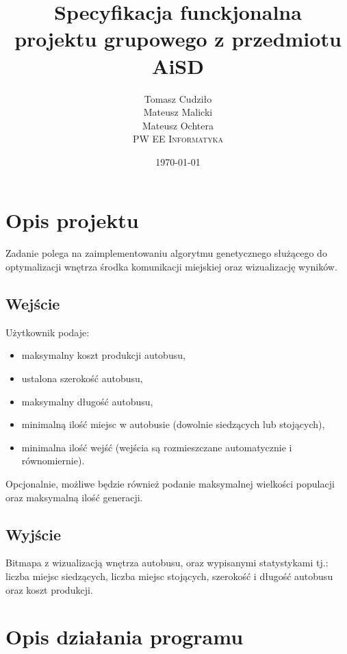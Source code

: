 \documentclass[10pt,a4paper]{article}
\begin{document}
\title{
  Specyfikacja funckjonalna\\
  projektu grupowego z przedmiotu AiSD
}
\author{
  Tomasz Cudziło\\
  Mateusz Malicki\\
  Mateusz Ochtera\\[14pt]
  \textsc{PW EE Informatyka}\\[7pt]
}
\date{\today}
\maketitle



\section{Opis projektu}

Zadanie polega na zaimplementowaniu algorytmu genetycznego służącego do
optymalizacji wnętrza środka komunikacji miejskiej oraz wizualizację wyników.


\subsection{Wejście}
Użytkownik podaje:
\begin{itemize}
  \item maksymalny koszt produkcji autobusu,
  \item ustalona szerokość autobusu,
  \item maksymalny długość autobusu,
  \item minimalną ilość miejsc w autobusie (dowolnie siedzących lub stojących),
  \item minimalna ilość wejść (wejścia są rozmieszczane automatycznie i
    równomiernie).
\end{itemize}
Opcjonalnie, możliwe będzie również podanie maksymalnej wielkości populacji oraz
maksymalną ilość generacji.


\subsection{Wyjście}
Bitmapa z wizualizacją wnętrza autobusu, oraz wypisanymi statystykami tj.:
liczba miejsc siedzących, liczba miejsc stojących, szerokość i długość autobusu
oraz koszt produkcji.



\section{Opis działania programu}
\end{document}
